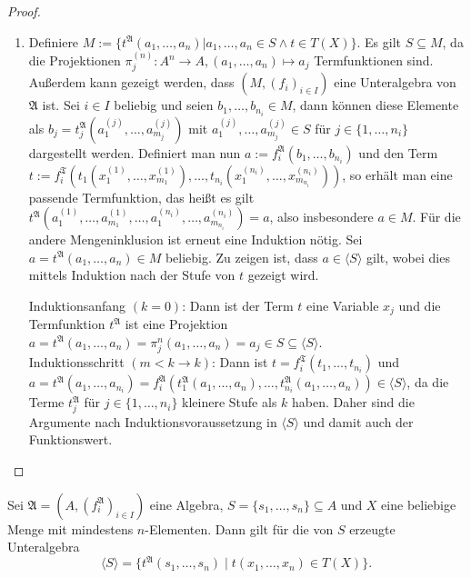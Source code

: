 \begin{proof}
\begin{enumerate}
        \item Definiere $M:=\{t^\mathfrak{A}(a_1,\ldots,a_n)\vert a_1,\ldots,a_n\in S\land t\in T(X)\}$.
        Es gilt $S\subseteq M$, da die Projektionen $\pi_j^{(n)}:A^n\to A, (a_1,\ldots,a_n)\mapsto a_j$ Termfunktionen sind.
        Außerdem kann gezeigt werden, dass $(M,(f_i)_{i\in I})$ eine Unteralgebra von $\mathfrak{A}$ ist. Sei $i\in I$ beliebig
        und seien $b_1,\ldots,b_{n_i}\in M$, dann können diese Elemente als $b_j=t_j^\mathfrak{A}(a_1^{(j)},\ldots,a_{m_j}^{(j)})$
        mit $a_1^{(j)},\ldots,a_{m_j}^{(j)}\in S$ für $j\in \{1,\ldots,n_i\}$ dargestellt werden. Definiert man nun $a:=f^\mathfrak{A}_i(b_1,\ldots,b_{n_i})$
        und den Term $t:=f_i^\mathfrak{T}(t_1(x_1^{(1)},\ldots,x_{m_1}^{(1)}),\ldots,t_{n_i}(x_1^{(n_i)},\ldots,x_{m_{n_i}}^{(n_i)}))$,
        so erhält man eine passende Termfunktion, das heißt es gilt $t^\mathfrak{A}(a_1^{(1)},\ldots,a_{m_1}^{(1)},\ldots,a_1^{(n_i)},\ldots,a_{m_{n_i}}^{(n_i)})=a$,
        also insbesondere $a\in M$. Für die andere Mengeninklusion ist erneut eine Induktion nötig.
        Sei $a=t^\mathfrak{A}(a_1,\ldots,a_n)\in M$ beliebig. Zu zeigen ist, dass $a\in \langle S\rangle$ gilt,
        wobei dies mittels Induktion nach der Stufe von $t$ gezeigt wird.

        Induktionsanfang $(k=0)$: Dann ist der Term $t$ eine Variable $x_j$ und die Termfunktion
        $t^\mathfrak{A}$ ist eine Projektion $a=t^\mathfrak{A}(a_1,\ldots,a_n)=\pi_j^n(a_1,\ldots,a_n)=a_j\in S\subseteq \langle S\rangle$.\\
        Induktionsschritt $(m<k\to k)$: Dann ist $t=f^\mathfrak{T}_i(t_1,\ldots,t_{n_i})$ und
        $a=t^\mathfrak{A}(a_1,\ldots,a_{n_i})=f^\mathfrak{A}_i(t^\mathfrak{A}_1(a_1,\ldots,a_n),\ldots,t^\mathfrak{A}_{n_i}(a_1,\ldots,a_n))\in\langle S\rangle$,
        da die Terme $t^\mathfrak{A}_j$ für $j\in\{1,\ldots,n_i\}$ kleinere Stufe als $k$ haben. Daher
        sind die Argumente nach Induktionsvoraussetzung in $\langle S\rangle$ und damit auch
        der Funktionswert.
    \end{enumerate}
\end{proof}

\begin{corollary}
    Sei $\mathfrak{A}=(A,(f^\mathfrak{A}_i)_{i\in I})$ eine Algebra, $S=\{s_1,\ldots,s_n\}\subseteq A$ und $X$ eine beliebige Menge mit mindestens $n$-Elementen.
    Dann gilt für die von $S$ erzeugte Unteralgebra
    $$ \langle S\rangle=\{t^\mathfrak{A}(s_1,\ldots,s_n)\mid t(x_1,\ldots,x_n)\in T(X)\}. $$
\end{corollary}

